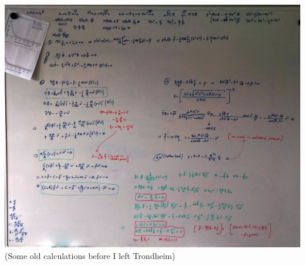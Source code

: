 \documentclass[\ifafour a4paper,12pt,\else a5paper,10pt,\fi%
onecolumn,oneside,article,%
british%
]{memoir}
\makeatletter
\theoremstyle{remark}
\theoremstyle{innote}
\def\sum{\DOTSI\sumop\slimits@}
\newcommand*{\mathte}[1]{\textbf{\textit{\textsf{#1}}}}
\newcommand*{\de}{\partialup}%
\newcommand*{\p}{\mathrm{P}}%
\renewcommand*{\|}[1][]{\nonscript\,#1\vert\nonscript\;\mathopen{}}
\newcommand*{\tsum}{\mathop{\textstyle\sum}\nolimits}
\newcommand*{\yr}{r}
\newcommand*{\yq}{\bm{q}}
\newcommand*{\yp}{\mathte{p}}
\newcommand*{\yE}{\varEta}
\newcommand*{\yc}{\bm{c}}
\makeatother
\begin{document}
\begin{center}%
\centering\includegraphics[width=\linewidth]{idealgas2_IMG_20200725_114540.jpg}\\
(Some old calculations before I left Trondheim)
\end{center}%






\end{document}
